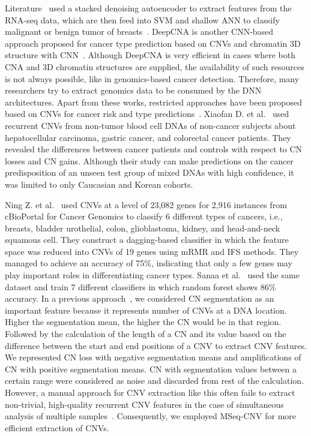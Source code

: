 \hspace*{3.5mm} Literature~\cite{17Danaee} used a stacked denoising autoencoder to extract features from the RNA-seq data, which are then feed into SVM and shallow ANN to classify malignant or benign tumor of breasts~\cite{18Chen}. DeepCNA is another CNN-based approach proposed for cancer type prediction based on CNVs and chromatin 3D structure with CNN~\cite{yuan2018cancer}. Although DeepCNA is very efficient in cases where both CNA and 3D chromatin structures are supplied, the availability of such resources is not always possible, like in genomics-based cancer detection. Therefore, many researchers try to extract genomics data to be consumed by the DNN architectures. Apart from these works, restricted approaches have been proposed based on CNVs for cancer risk and type predictions~\cite{ding2014application, zhang2016classification, elsadek2018supervised}. Xiaofan D. et al.~\cite{ding2014application} used recurrent CNVs from non-tumor blood cell DNAs of non-cancer subjects about hepatocellular carcinoma, gastric cancer, and colorectal cancer patients. They revealed the differences between cancer patients and controls with respect to CN losses and CN gains. Although their study can make predictions on the cancer predisposition of an unseen test group of mixed DNAs with high confidence, it was limited to only Caucasian and Korean cohorts. 

\hspace*{3.5mm} Ning Z. et al.~\cite{zhang2016classification} used CNVs at a level of 23,082 genes for 2,916 instances from cBioPortal for Cancer Genomics to classify 6 different types of cancers, i.e., breasts, bladder urothelial, colon, glioblastoma, kidney, and head-and-neck squamous cell. They construct a dagging-based classifier in which the feature space was reduced into CNVs of 19 genes using mRMR and IFS methods. They managed to achieve an accuracy of 75\%, indicating that only a few genes may play important roles in differentiating cancer types. Sanaa et al.~\cite{elsadek2018supervised} used the same dataset and train 7 different classifiers in which random forest shows 86\% accuracy. %
In a previous approach~\cite{karim2018a2ic}, we considered CN segmentation as an important feature because it represents number of CNVs at a DNA location. Higher the segmentation mean, the higher the CN would be in that region. Followed by the calculation of the length of a CN and its value based on the difference between the start and end positions of a CNV to extract CNV features. We represented CN loss with negative segmentation means and amplifications of CN with positive segmentation means. CN with segmentation values between a certain range were considered as noise and discarded from rest of the calculation. However, a manual approach for CNV extraction like this often fails to extract non-trivial, high-quality recurrent CNV features in the case of simultaneous analysis of multiple samples~\cite{malekpour2018mseq}. Consequently, we employed MSeq-CNV for more efficient extraction of CNVs. 

